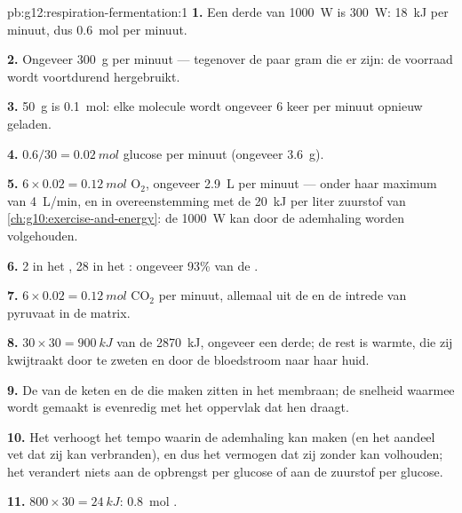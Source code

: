 \begin{solution}{pb:g12:respiration-fermentation:1}
\textbf{1.} Een derde van \qty{1000}{W} is \qty{300}{W}: \qty{18}{kJ} per
minuut, dus \qty{0.6}{mol}  per minuut.

\textbf{2.} Ongeveer \qty{300}{g} per minuut --- tegenover de paar gram
die er zijn: de voorraad wordt voortdurend hergebruikt.

\textbf{3.} \qty{50}{g} is \qty{0.1}{mol}: elke molecule wordt ongeveer 6
keer per minuut opnieuw geladen.

\textbf{4.} $0.6/30 = \qty{0.02}{mol}$ glucose per minuut (ongeveer
\qty{3.6}{g}).

\textbf{5.} $6 \times 0.02 = \qty{0.12}{mol}$ $\mathrm{O_2}$, ongeveer
\qty{2.9}{L} per minuut --- onder haar maximum van \qty{4}{L/min}, en in
overeenstemming met de \qty{20}{kJ} per liter zuurstof van
\cref{ch:g10:exercise-and-energy}: de \qty{1000}{W} kan door de ademhaling
worden volgehouden.

\textbf{6.} 2 in het , 28 in het : ongeveer 93\%
van de .

\textbf{7.} $6 \times 0.02 = \qty{0.12}{mol}$ $\mathrm{CO_2}$ per
minuut, allemaal uit de  en de intrede van pyruvaat in de matrix.

\textbf{8.} $30 \times 30 = \qty{900}{kJ}$ van de \qty{2870}{kJ},
ongeveer een derde; de rest is warmte, die zij kwijtraakt door te zweten
en door de bloedstroom naar haar huid.

\textbf{9.} De  van de keten en de  die  maken zitten in
het membraan; de snelheid waarmee  wordt gemaakt is evenredig met het
oppervlak dat hen draagt.

\textbf{10.} Het verhoogt het tempo waarin de ademhaling  kan maken (en
het aandeel vet dat zij kan verbranden), en dus het vermogen dat zij
zonder  kan volhouden; het verandert niets aan de opbrengst per
glucose of aan de zuurstof per glucose.

\textbf{11.} $800 \times 30 = \qty{24}{kJ}$: \qty{0.8}{mol} .


\end{solution}
